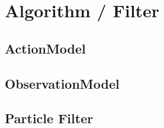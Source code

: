 \chapter{Algorithm / Filter} \label{chap:pf}
\section{ActionModel}
\section{ObservationModel}
\section{Particle Filter}
